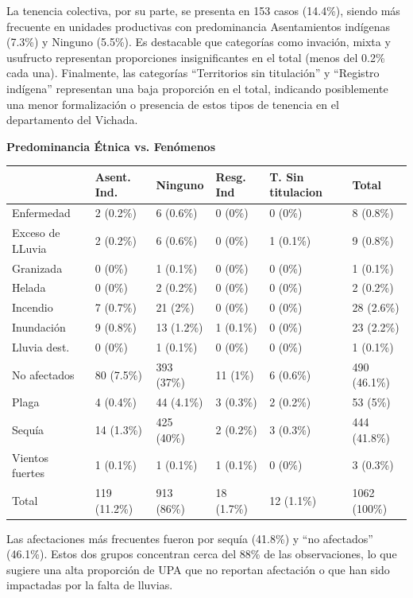 \documentclass[]{tufte-handout}
\begin{document}
\justify

La tenencia colectiva, por su parte, se presenta en 153 casos (14.4\%),
siendo más frecuente en unidades productivas con predominancia
Asentamientos indígenas (7.3\%) y Ninguno (5.5\%). Es destacable que
categorías como invación, mixta y usufructo representan proporciones
insignificantes en el total (menos del 0.2\% cada una). Finalmente, las
categorías ``Territorios sin titulación'' y ``Registro indígena''
representan una baja proporción en el total, indicando posiblemente una
menor formalización o presencia de estos tipos de tenencia en el
departamento del Vichada.

\begin{center}
\textbf{Predominancia Étnica vs. Fenómenos}
\end{center}

\begin{tabular}{llllll}
\toprule
  & Asent. Ind. & Ninguno & Resg. Ind & T. Sin titulacion & Total\\
\midrule
Enfermedad & 2 (0.2\%) & 6 (0.6\%) & 0 (0\%) & 0 (0\%) & 8 (0.8\%)\\
Exceso de LLuvia & 2 (0.2\%) & 6 (0.6\%) & 0 (0\%) & 1 (0.1\%) & 9 (0.8\%)\\
Granizada & 0 (0\%) & 1 (0.1\%) & 0 (0\%) & 0 (0\%) & 1 (0.1\%)\\
Helada & 0 (0\%) & 2 (0.2\%) & 0 (0\%) & 0 (0\%) & 2 (0.2\%)\\
Incendio & 7 (0.7\%) & 21 (2\%) & 0 (0\%) & 0 (0\%) & 28 (2.6\%)\\
\addlinespace
Inundación & 9 (0.8\%) & 13 (1.2\%) & 1 (0.1\%) & 0 (0\%) & 23 (2.2\%)\\
Lluvia dest. & 0 (0\%) & 1 (0.1\%) & 0 (0\%) & 0 (0\%) & 1 (0.1\%)\\
No afectados & 80 (7.5\%) & 393 (37\%) & 11 (1\%) & 6 (0.6\%) & 490 (46.1\%)\\
Plaga & 4 (0.4\%) & 44 (4.1\%) & 3 (0.3\%) & 2 (0.2\%) & 53 (5\%)\\
Sequía & 14 (1.3\%) & 425 (40\%) & 2 (0.2\%) & 3 (0.3\%) & 444 (41.8\%)\\
\addlinespace
Vientos fuertes & 1 (0.1\%) & 1 (0.1\%) & 1 (0.1\%) & 0 (0\%) & 3 (0.3\%)\\
Total & 119 (11.2\%) & 913 (86\%) & 18 (1.7\%) & 12 (1.1\%) & 1062 (100\%)\\
\bottomrule
\end{tabular}
\vspace{0.5cm}

Las afectaciones más frecuentes fueron por sequía (41.8\%) y ``no
afectados'' (46.1\%). Estos dos grupos concentran cerca del 88\% de las
observaciones, lo que sugiere una alta proporción de UPA que no reportan
afectación o que han sido impactadas por la falta de lluvias.
\end{document}
